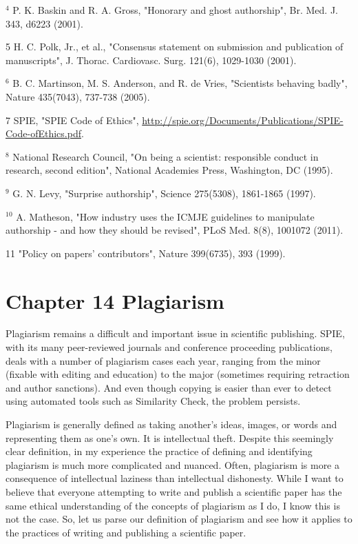${ }^{4}$ P. K. Baskin and R. A. Gross, "Honorary and ghost authorship", Br. Med. J. 343, d6223 (2001).

5 H. C. Polk, Jr., et al., "Consensus statement on submission and publication of manuscripts", J. Thorac. Cardiovasc. Surg. 121(6), 1029-1030 (2001).

${ }^{6}$ B. C. Martinson, M. S. Anderson, and R. de Vries, "Scientists behaving badly", Nature 435(7043), 737-738 (2005).

7 SPIE, "SPIE Code of Ethics", \href{http://spie.org/Documents/Publications/SPIE-Code-ofEthics.pdf}{http://spie.org/Documents/Publications/SPIE-Code-ofEthics.pdf}.

${ }^{8}$ National Research Council, "On being a scientist: responsible conduct in research, second edition", National Academies Press, Washington, DC (1995).

${ }^{9}$ G. N. Levy, "Surprise authorship", Science 275(5308), 1861-1865 (1997).

${ }^{10}$ A. Matheson, "How industry uses the ICMJE guidelines to manipulate authorship - and how they should be revised", PLoS Med. 8(8), 1001072 (2011).

11 "Policy on papers' contributors", Nature 399(6735), 393 (1999).

\section*{Chapter 14 Plagiarism}
Plagiarism remains a difficult and important issue in scientific publishing. SPIE, with its many peer-reviewed journals and conference proceeding publications, deals with a number of plagiarism cases each year, ranging from the minor (fixable with editing and education) to the major (sometimes requiring retraction and author sanctions). And even though copying is easier than ever to detect using automated tools such as Similarity Check, the problem persists.

Plagiarism is generally defined as taking another's ideas, images, or words and representing them as one's own. It is intellectual theft. Despite this seemingly clear definition, in my experience the practice of defining and identifying plagiarism is much more complicated and nuanced. Often, plagiarism is more a consequence of intellectual laziness than intellectual dishonesty. While I want to believe that everyone attempting to write and publish a scientific paper has the same ethical understanding of the concepts of plagiarism as I do, I know this is not the case. So, let us parse our definition of plagiarism and see how it applies to the practices of writing and publishing a scientific paper.

